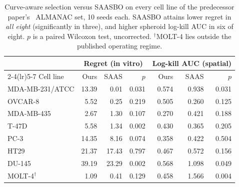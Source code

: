 \documentclass{article}
\begin{document}
\nocite{*}



\newpage
\appendix
\onecolumn
\begin{table}[t]
\caption{Curve-aware selection versus SAASBO on every cell line of the
predecessor paper's~\citep{gonehal2026savitar} ALMANAC set, 10 seeds each. SAASBO attains lower regret
in \emph{all eight} (significantly in three), and higher spheroid log-kill
AUC in six of eight. $p$ is a paired Wilcoxon test, uncorrected.
$^\dagger$MOLT-4 lies outside the published operating regime.}
\label{tab:saas}
\vskip 0.1in
\centering
\small
\setlength{\tabcolsep}{6pt}
\begin{tabular}{lrrrrrr}
\toprule
& \multicolumn{3}{c}{Regret (in vitro)} & \multicolumn{3}{c}{Log-kill AUC (spatial)} \\
\cmidrule(lr){2-4}\cmidrule(lr){5-7}
Cell line & Ours & SAAS & $p$ & Ours & SAAS & $p$ \\
\midrule
MDA-MB-231/ATCC & 13.39 & 0.01 & 0.031 & 0.574 & 0.938 & 0.031 \\
OVCAR-8 & 5.52 & 0.25 & 0.219 & 0.505 & 0.260 & 0.125 \\
MDA-MB-435 & 2.67 & 1.30 & 0.107 & 0.270 & 0.421 & 0.188 \\
T-47D & 5.58 & 1.34 & 0.002 & 0.430 & 0.365 & 0.205 \\
PC-3 & 14.35 & 8.16 & 0.074 & 0.358 & 0.422 & 0.504 \\
HT29 & 21.37 & 17.43 & 0.797 & 0.467 & 0.572 & 0.156 \\
DU-145 & 39.19 & 23.29 & 0.002 & 0.568 & 1.098 & 0.049 \\
MOLT-4$^\dagger$ & 1.09 & 0.41 & 0.129 & 0.458 & 1.566 & 0.004 \\
\bottomrule
\end{tabular}
\end{table}
\end{document}
